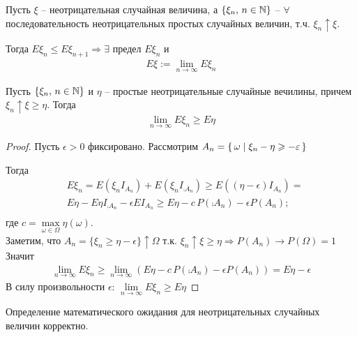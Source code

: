
\begin{definition}
  Пусть $\xi$ -- неотрицательная случайная величина, 
  а $\{ \xi_n,\, n \in \mathbb{N} \}$ -- $\forall$ последовательность неотрицательных 
  простых случайных величин, т.ч. $\xi_n \uparrow \xi$. 

  Тогда $E \xi_n \leq E \xi_{n + 1} \Rightarrow \exists$ предел $E \xi_n$ и
  \begin{align*}
    E \xi := \lim_{n \to \infty} E \xi_n
  \end{align*}
\end{definition}

\begin{lemma}
  Пусть $\{ \xi_n,\, n \in \mathbb{N} \}$ и $\eta$ -- простые неотрицательные случайные вечилины, 
  причем $\xi_n \uparrow \xi \geq \eta$. Тогда 
  \begin{align*}
    \lim_{n \to \infty} E \xi_n \geq E \eta
  \end{align*}
\end{lemma}

\begin{proof}
  Пусть $\epsilon > 0$ фиксировано. 
  Рассмотрим $A_n = \left\{ \, \omega \mid \xi_n - \eta \geqslant -\varepsilon \, \right\}$

  Тогда
  \begin{align*}
    &E\xi_n = E(\xi_n I_{A_n}) + E(\xi_n I_{\comp{A}_n}) \geq E((\eta - \epsilon) I_{A_n}) = \\
    &E \eta - E\eta I_{\comp{A}_n} - \epsilon E I_{A_n} \geq 
    E\eta - c\, P(\comp{A}_n) - \epsilon P(A_n);\\
  \end{align*}
  где $c = \max\limits_{\omega \in \Omega} \eta(\omega)$. \\
  Заметим, что $A_n = \{ \xi_n \geq \eta - \epsilon \} \uparrow \Omega$ 
  т.к. $\xi_n \uparrow \xi \geq \eta \Rightarrow P(A_n) \rightarrow P(\Omega) = 1$\\
  Значит
  \begin{align*}
    \lim_{n \to \infty} E\xi_n \geq \lim_{n \to \infty} (E\eta - c\, P(\comp{A}_n) - \epsilon P(A_n)) = E\eta - \epsilon
  \end{align*}
  В силу произвольности $\epsilon$: $\lim\limits_{n \to \infty} E \xi_n \geq E \eta$
\end{proof}

\begin{corollary}
  Определение математического ожидания для неотрицательных случайных величин корректно.
\end{corollary}

